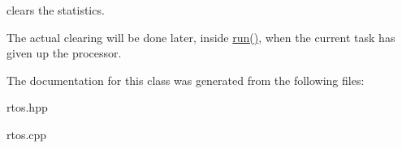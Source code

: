clears the statistics. 

The actual clearing will be done later, inside \hyperlink{classrtos_a1b1490e971b7908f28f7af9cfb18e5aa}{run()}, when the current task has given up the processor. 

The documentation for this class was generated from the following files\+:\begin{DoxyCompactItemize}
\item 
rtos.\+hpp\item 
rtos.\+cpp\end{DoxyCompactItemize}
